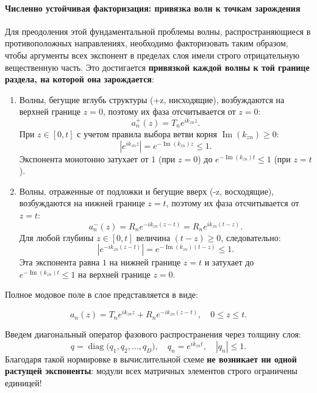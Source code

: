 \documentclass[a4paper,11pt]{article}
\begin{document}
\paragraph{Численно устойчивая факторизация: привязка волн к точкам зарождения}
Для преодоления этой фундаментальной проблемы волны, распространяющиеся в противоположных направлениях, необходимо факторизовать таким образом, чтобы аргументы всех экспонент в пределах слоя имели строго отрицательную вещественную часть. 
Это достигается \textbf{привязкой каждой волны к той границе раздела, на которой она зарождается}:
\begin{enumerate}
    \item Волны, бегущие вглубь структуры (+z, нисходящие), возбуждаются на верхней границе $z = 0$, поэтому их фаза отсчитывается от $z = 0$:
    \begin{equation}
        a_n^+(z) = T_n e^{i k_{zn} z}.
    \end{equation}
    При $z \in [0, t]$ с учетом правила выбора ветви корня $\operatorname{Im}(k_{zn}) \ge 0$:
    \begin{equation}
        |e^{i k_{zn} z}| = e^{-\operatorname{Im}(k_{zn}) z} \le 1.
    \end{equation}
    Экспонента монотонно затухает от $1$ (при $z = 0$) до $e^{-\operatorname{Im}(k_{zn}) t} \le 1$ (при $z = t$).
    
    \item Волны, отраженные от подложки и бегущие вверх (-z, восходящие), возбуждаются на нижней границе $z = t$, поэтому их фаза отсчитывается от $z = t$:
    \begin{equation}
        a_n^-(z) = R_n e^{-i k_{zn} (z - t)} = R_n e^{i k_{zn} (t - z)}.
    \end{equation}
    Для любой глубины $z \in [0, t]$ величина $(t - z) \ge 0$, следовательно:
    \begin{equation}
        |e^{-i k_{zn} (z - t)}| = e^{-\operatorname{Im}(k_{zn}) (t - z)} \le 1.
    \end{equation}
    Эта экспонента равна $1$ на нижней границе $z = t$ и затухает до $e^{-\operatorname{Im}(k_{zn}) t} \le 1$ на верхней границе $z = 0$.
\end{enumerate}

Полное модовое поле в слое представляется в виде:
\begin{mathbox}
\begin{equation}
    a_n(z) = T_n e^{i k_{zn} z} + R_n e^{-i k_{zn}(z - t)}, \quad 0 \le z \le t.
    \label{eq:stable_mode_amps_explicit}
\end{equation}
\end{mathbox}
Введем диагональный оператор фазового распространения через толщину слоя:
\begin{equation}
    q = \operatorname{diag}\big(q_1, q_2, \dots, q_D\big), \quad q_n = e^{i k_{zn} t}, \quad |q_n| \le 1.
\end{equation}
Благодаря такой нормировке в вычислительной схеме \textbf{не возникает ни одной растущей экспоненты}: модули всех матричных элементов строго ограничены единицей!
\end{document}
